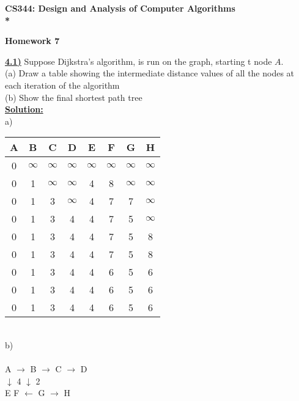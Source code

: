 \documentclass{article}
\begin{document}
\begin{center}
\bf{\LARGE CS344: Design and Analysis of Computer Algorithms} \\*

\vspace{0.2in}
{\bf {\Large Homework 7}}
\end{center}

\vspace{.2in}


\vspace{.2in}
\noindent \textbf{\underline{4.1)}} Suppose Dijkstra's algorithm, is run on the graph, starting t node $A$.\\

\indent (a) Draw a table showing the intermediate distance values of all the nodes at each iteration of the algorithm \\
\indent (b) Show the final shortest path tree \\

\noindent \textbf{\underline{Solution:}}  \\
a) \\

\begin{tabular}{ | c c c c c c c c |}
  \hline
  A & B & C & D & E & F & G & H\\ \hline
  0 & $\infty$ & $\infty$ & $\infty$ & $\infty$ & $\infty$ & $\infty$ & $\infty$ \\
  0 & 1 & $\infty$ & $\infty$ & 4 & 8 & $\infty$ & $\infty$\\
  0 & 1 & 3 & $\infty$ & 4 & 7 & 7 & $\infty$\\
  0 & 1 & 3 & 4 & 4 & 7 & 5 & $\infty$\\
  0 & 1 & 3 & 4 & 4 & 7 & 5 & 8\\
  0 & 1 & 3 & 4 & 4 & 7 & 5 & 8\\
  0 & 1 & 3 & 4 & 4 & 6 & 5 & 6\\
  0 & 1 & 3 & 4 & 4 & 6 & 5 & 6\\
  0 & 1 & 3 & 4 & 4 & 6 & 5 & 6\\
  \hline
\end{tabular} \\

\vspace{.2in}
\noindent b) \\
   \\
     A   $\rightarrow$    B         $\rightarrow$          C         $\rightarrow$        D\\
      $\downarrow$ 4 \indent \indent $\downarrow$ 2 \\
      E \indent F $\leftarrow$ G $\rightarrow$ H\\
\indent {} \indent {}\\
\end{document}
